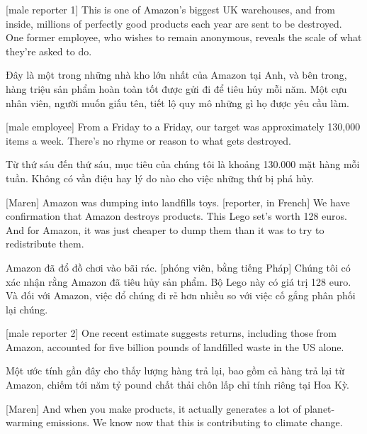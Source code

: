 \documentclass[a4paper]{article}
\begin{document}
	[male reporter 1] This is one of Amazon's biggest UK warehouses, and from inside, millions of perfectly good products each year are sent to be destroyed. One former employee, who wishes to remain anonymous, reveals the scale of what they're asked to do.
	
	\begin{vietnamese-v2}
		 Đây là một trong những nhà kho lớn nhất của Amazon tại Anh, và bên trong, hàng triệu sản phẩm hoàn toàn tốt được gửi đi để tiêu hủy mỗi năm. Một cựu nhân viên, người muốn giấu tên, tiết lộ quy mô những gì họ được yêu cầu làm.
	\end{vietnamese-v2}
	
	[male employee] From a Friday to a Friday, our target was approximately 130,000 items a week.
	There's no rhyme or reason to what gets destroyed.
	
	\begin{vietnamese-v2}
		 Từ thứ sáu đến thứ sáu, mục tiêu của chúng tôi là khoảng 130.000 mặt hàng mỗi tuần.
		Không có vần điệu hay lý do nào cho việc những thứ bị phá hủy.
	\end{vietnamese-v2}
	
	[Maren] Amazon was dumping into landfills toys.
	[reporter, in French] We have confirmation that Amazon destroys products.
	This Lego set's worth 128 euros.
	And for Amazon, it was just cheaper to dump them than it was to try to redistribute them.
	
	\begin{vietnamese-v2}
		[Maren] Amazon đã đổ đồ chơi vào bãi rác.
		[phóng viên, bằng tiếng Pháp] Chúng tôi có xác nhận rằng Amazon đã tiêu hủy sản phẩm.
		Bộ Lego này có giá trị 128 euro.
		Và đối với Amazon, việc đổ chúng đi rẻ hơn nhiều so với việc cố gắng phân phối lại chúng.
	\end{vietnamese-v2}
	
	[male reporter 2] One recent estimate suggests returns, including those from Amazon, accounted for five billion pounds of landfilled waste in the US alone.
	
	\begin{vietnamese-v2}
		 Một ước tính gần đây cho thấy lượng hàng trả lại, bao gồm cả hàng trả lại từ Amazon, chiếm tới năm tỷ pound chất thải chôn lấp chỉ tính riêng tại Hoa Kỳ.
	\end{vietnamese-v2}
	
	[Maren] And when you make products, it actually generates a lot of planet-warming emissions. We know now that this is contributing to climate change.
	
\end{document}

